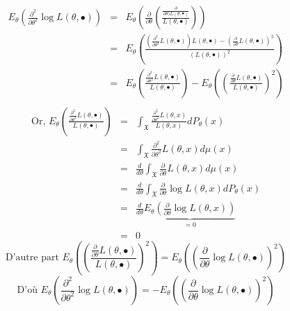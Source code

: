 

\begin{dem}
\begin{eqnarray*}
	E_{\theta}\left(\frac{\partial^2}{\partial\theta^2} \log L(\theta,\bullet)\right)&=&E_{\theta}\left( \frac{\partial}{\partial\theta}\left( \frac{\frac{\partial}{\partial\theta)L(\theta,\bullet)}}{L(\theta,\bullet)}\right)\right)\\
&=&E_{\theta}\left(\frac{\left(\frac{\partial^2}{\partial\theta^2}L(\theta,\bullet)\right)L(\theta,\bullet)-\left(\frac{\partial}{\partial\theta}L(\theta,\bullet)\right)^2}{(L(\theta,\bullet))^2} \right)\\
&=&E_{\theta}\left(\frac{\frac{\partial^2}{\partial\theta^2}L(\theta,\bullet)}{L(\theta,\bullet)}\right)-E_{\theta}\left(\left(\frac{\frac{\partial}{\partial\theta}L(\theta,\bullet)}{L(\theta,\bullet)}\right)^2\right)\\
\end{eqnarray*}
\begin{eqnarray*}
\text{Or, } E_{\theta}\left(\frac{\frac{\partial^2}{\partial\theta^2}L(\theta,\bullet)}{L(\theta,\bullet)}\right)&=&\int_{\mathfrak{X}}\frac{\frac{\partial^2}{\partial\theta^2}L(\theta,x)}{L(\theta,x)}dP_{\theta}(x)\\
&=&\int_{\mathfrak{X}} \frac{\partial^2}{\partial\theta^2} L(\theta,x) d\mu(x)\\
&=& \frac{d}{d\theta} \int_{\mathfrak{X}} \frac{\partial}{\partial\theta} L(\theta,x) d\mu(x) \\
&=& \frac{d}{d\theta} \int_{\mathfrak{X}} \frac{\partial}{\partial\theta} \log L(\theta,x) dP_{\theta}(x)\\
&=& \frac{d}{d\theta} \underbrace{E_{\theta}\left(\frac{\partial}{\partial\theta} \log L(\theta,x)\right)}_{=0} \\
&=& 0
\end{eqnarray*}
\[\text{D'autre part } E_{\theta}\left(\left(\frac{\frac{\partial}{\partial\theta}L(\theta,\bullet)}{L(\theta,\bullet)}\right)^2\right) = E_{\theta}\left(\left(\frac{\partial}{\partial\theta}\log L(\theta,\bullet)\right)^2\right)\]
\[\text{D'où } E_{\theta}\left(\frac{\partial^2}{\partial\theta^2} \log L(\theta,\bullet)\right)=-E_{\theta}\left(\left(\frac{\partial}{\partial\theta}\log L(\theta,\bullet)\right)^2\right)\]
\end{dem}

